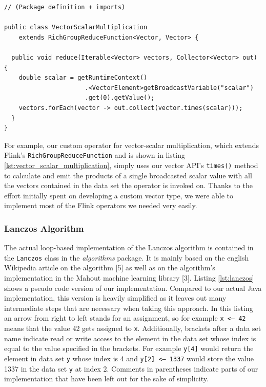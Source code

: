 \begin{lstlisting}[label=lst:vector_scalar_multiplication,captionpos=b,caption
=Implementation of the custom operator for vector-scalar multiplication]
// (Package definition + imports)

public class VectorScalarMultiplication
    extends RichGroupReduceFunction<Vector, Vector> {
    
  public void reduce(Iterable<Vector> vectors, Collector<Vector> out) {
    double scalar = getRuntimeContext()
                      .<VectorElement>getBroadcastVariable("scalar")
                      .get(0).getValue();
    vectors.forEach(vector -> out.collect(vector.times(scalar)));
  }
}
\end{lstlisting}

For example, our custom operator for vector-scalar multiplication, which
extends Flink's \texttt{RichGroupReduceFunction} and is shown in listing
\ref{lst:vector_scalar_multiplication}, simply uses our vector API's
\texttt{times()} method to calculate and emit the products of a single
broadcasted scalar value with all the vectors contained in the data set the
operator is invoked on. Thanks to the effort initially spent on developing a
custom vector type, we were able to implement most of the Flink operators we
needed very easily.


\subsubsection{Lanczos Algorithm}

The actual loop-based implementation of the Lanczos algorithm is contained in
the \texttt{Lanczos} class in the \textit{algorithms} package. It is mainly
based on the english Wikipedia article on the algorithm [5] as well as on the
algorithm's implementation in the Mahout machine learning library [3]. Listing
\ref{lst:lanczos} shows a pseudo code version of our implementation. Compared
to our actual Java implementation, this version is heavily simplified as it
leaves out many intermediate steps that are necessary when taking this
approach. In this listing an arrow from right to left stands for an assignment,
so for example \texttt{x <-- 42} means that the value 42 gets assigned to
\texttt{x}. Additionally, brackets after a data set name indicate read or write
access to the element in the data set whose index is equal to the value
specified in the brackets. For example \texttt{y[4]} would return the element
in data set \texttt{y} whose index is 4 and \texttt{y[2] <-- 1337} would store
the value 1337 in the data set \texttt{y} at index 2. Comments in parentheses
indicate parts of our implementation that have been left out for the sake of
simplicity.

